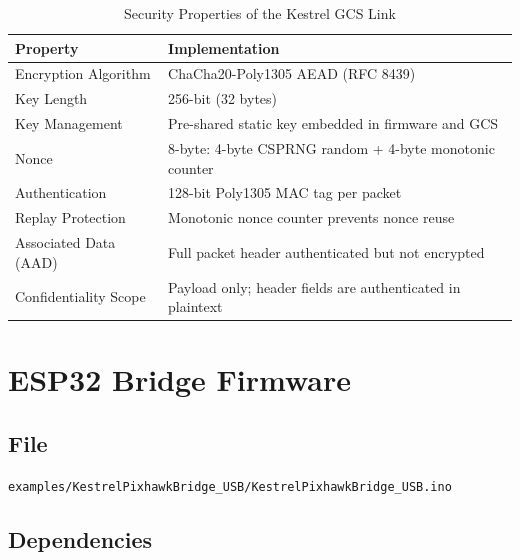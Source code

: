 \documentclass[11pt,a4paper]{article}
\begin{document}
\begin{table}[H]
    \centering
    \begin{tabularx}{\textwidth}{@{}lX@{}}
        \toprule
        \textbf{Property}       & \textbf{Implementation} \\
        \midrule
        Encryption Algorithm    & ChaCha20-Poly1305 AEAD (RFC 8439) \\
        Key Length              & 256-bit (32 bytes) \\
        Key Management          & Pre-shared static key embedded in firmware and GCS \\
        Nonce                   & 8-byte: 4-byte CSPRNG random + 4-byte monotonic counter \\
        Authentication          & 128-bit Poly1305 MAC tag per packet \\
        Replay Protection       & Monotonic nonce counter prevents nonce reuse \\
        Associated Data (AAD)   & Full packet header authenticated but not encrypted \\
        Confidentiality Scope   & Payload only; header fields are authenticated in plaintext \\
        \bottomrule
    \end{tabularx}
    \caption{Security Properties of the Kestrel GCS Link}
\end{table}

\newpage

\section{ESP32 Bridge Firmware}
\label{sec:firmware}

\subsection{File}
\begin{center}
    \texttt{examples/KestrelPixhawkBridge\_USB/KestrelPixhawkBridge\_USB.ino}
\end{center}

\subsection{Dependencies}
\end{document}
